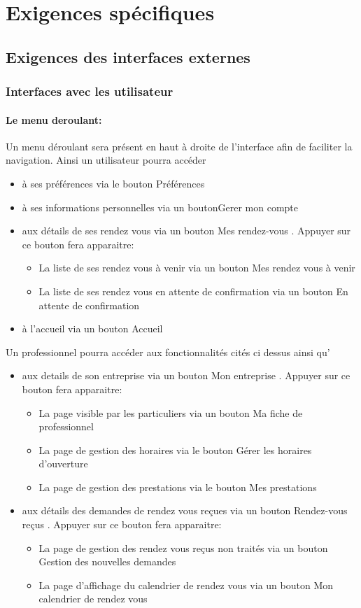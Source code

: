 \documentclass{article}
\begin{document}
\section{Exigences spécifiques}
\subsection{Exigences des interfaces externes}
\subsubsection{Interfaces avec les utilisateur}
\paragraph{Le menu deroulant:}
Un menu déroulant sera présent en haut à droite de l'interface afin de faciliter la navigation.
Ainsi un utilisateur pourra accéder 
\begin{itemize}
\item à ses préférences via le bouton \og Préférences \fg{}
\item à ses informations personnelles via un bouton\og Gerer mon compte \fg{}
\item aux détails de ses rendez vous via un bouton \og Mes rendez-vous \fg{}. Appuyer sur ce bouton fera apparaitre:
	\begin{itemize}
	\item La liste de ses rendez vous à venir via un bouton \og Mes rendez vous à venir \fg{}
	\item La liste de ses rendez vous en attente de confirmation via un bouton \og En attente de confirmation \fg{}
	\end{itemize}
\item à l'accueil via un bouton \og Accueil \fg{}
\end{itemize}
Un professionnel pourra accéder aux fonctionnalités cités ci dessus ainsi qu'
\begin{itemize}
\item aux details de son entreprise via un bouton \og Mon entreprise \fg{}. Appuyer sur ce bouton fera apparaitre:
\begin{itemize}
\item La page visible par les particuliers via un bouton \og Ma fiche de professionnel \fg{}
\item La page de gestion des horaires via le bouton \og Gérer les horaires d'ouverture \fg{}
\item La page de gestion des prestations via le bouton \og Mes prestations \fg{}
\end{itemize}
\item aux détails des demandes de rendez vous reçues  via un bouton \og Rendez-vous reçus \fg{}. Appuyer sur ce bouton fera apparaitre: 
\begin{itemize}
\item La page de gestion des rendez vous reçus non traités via un bouton \og Gestion des nouvelles demandes \fg{}
\item La page d'affichage du calendrier de rendez vous via un bouton \og Mon calendrier de rendez vous \fg{}
\end{itemize}
\end{itemize}
\end{document}
